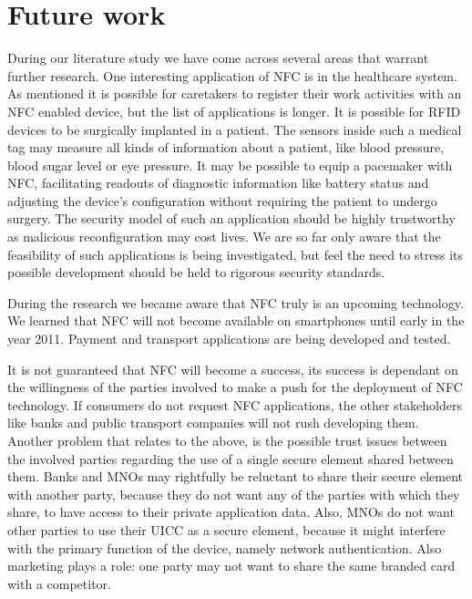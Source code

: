 \section{Future work}
\label{chap:future_work}

During our literature study we have come across several areas that warrant further research.
One interesting application of NFC is in the healthcare system.
As mentioned it is possible for caretakers to register their work activities with an NFC enabled device, but the list of applications is longer.
It is possible for RFID devices to be surgically implanted in a patient.
The sensors inside such a medical tag may measure all kinds of information about a patient, like blood pressure, blood sugar level or eye pressure.
It may be possible to equip a pacemaker with NFC, facilitating readouts of diagnostic information like battery status and adjusting the device's configuration without requiring the patient to undergo surgery. 
The security model of such an application should be highly trustworthy as malicious reconfiguration may cost lives.
We are so far only aware that the feasibility of such applications is being investigated, but feel the need to stress its possible development should be held to rigorous security standards.

During the research we became aware that NFC truly is an upcoming technology.
We learned that NFC will not become available on smartphones until early in the year 2011.
Payment and transport applications are being developed and tested.

It is not guaranteed that NFC will become a success, its success is dependant on the willingness of the parties involved to make a push for the deployment of NFC technology.
If consumers do not request NFC applications, the other stakeholders like banks and public transport companies will not rush developing them.
Another problem that relates to the above, is the possible trust issues between the involved parties regarding the use of a single secure element shared between them.
Banks and MNOs may rightfully be reluctant to share their secure element with another party, because they do not want any of the parties with which they share, to have access to their private application data.
Also, MNOs do not want other parties to use their UICC as a secure element, because it might interfere with the primary function of the device, namely network authentication.
Also marketing plays a role: one party may not want to share the same branded card with a competitor.

